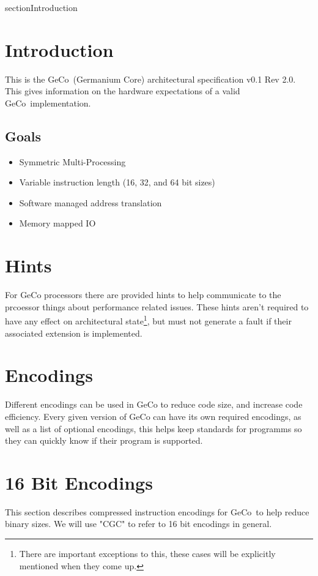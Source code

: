 \documentclass[6pt]{article}
\title{\name}
\author{Lilly Anderson}
\def\version{0.1 Rev 2.0}
\def\name{Germanium Core}
\def\sname{GeCo}
\begin{document}
\maketitle

\pagebreak
\tableofcontents

\pagebreak
{}
{section}{Introduction}
\section*{Introduction}
This is the \sname\ (\name) architectural specification v\version. This gives information on the hardware expectations of a valid \sname\ implementation.

\subsection{Goals}
\begin{itemize}
    \item Symmetric Multi-Processing
    \item Variable instruction length (16, 32, and 64 bit sizes)
    \item Software managed address translation
    \item Memory mapped IO
\end{itemize}

\section{Hints}
For GeCo processors there are provided hints to help communicate to the prcoessor things about performance related issues. These hints aren't required to have any effect on architectural state\footnote{There are important exceptions to this, these cases will be explicitly mentioned when they come up.}, but must not generate a fault if their associated extension is implemented.

\section{Encodings}
Different encodings can be used in GeCo to reduce code size, and increase code efficiency. Every given version of GeCo can have its own required encodings, as well as a list of optional encodings, this helps keep standards for programms so they can quickly know if their program is supported.

\section{16 Bit Encodings}
This section describes compressed instruction encodings for \sname\ to help reduce binary sizes. We will use "CGC" to refer to 16 bit encodings in general.
\end{document}
